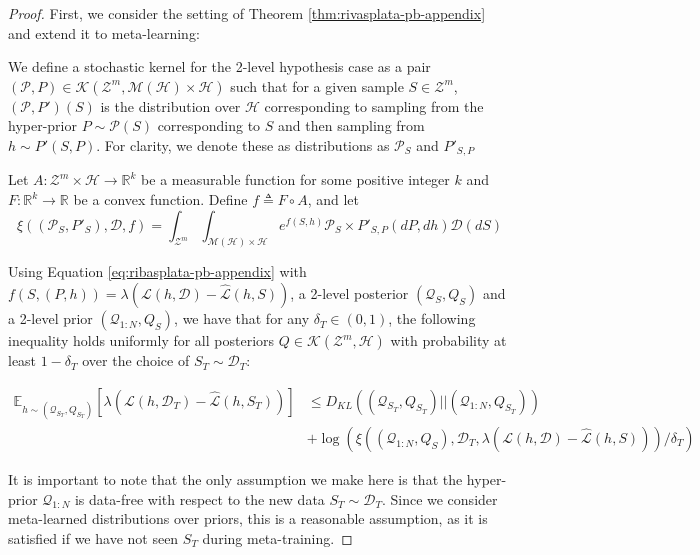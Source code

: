 \documentclass{article}
\theoremstyle{definition}
\newcommand{\Expect}[2]{\mathbb{E}_{#1}\left [#2 \right ]}
\begin{document}
\begin{proof}
	First, we consider the setting of Theorem \ref{thm:rivasplata-pb-appendix} and extend it to meta-learning:
	
	We define a stochastic kernel for the 2-level hypothesis case as a pair $(\mathcal{P},P)\in \mathcal{K}(\mathcal{Z}^m, \mathcal{M}(\mathcal{H})\times \mathcal{H})$ such that for a given sample $S\in \mathcal{Z}^m$,  $(\mathcal{P},P')(S)$ is the distribution over $\mathcal{H}$ corresponding to sampling from the hyper-prior $P\sim \mathcal{P}(S)$ corresponding to $S$ and then sampling from $h\sim P'(S, P)$. For clarity, we denote these as distributions as $\mathcal{P}_S$ and $P'_{S,P}$
	
	Let $A: \mathcal{Z}^m\times \mathcal{H}\rightarrow \mathbb{R}^k$ be a measurable function for some positive integer $k$ and $F:\mathbb{R}^k\rightarrow \mathbb{R}$ be a convex function.
	Define $f\triangleq F\circ A$, and let 
	$$\xi((\mathcal{P}_S,P'_S), \mathcal{D}, f)=\int_{\mathcal{Z}^m}\int_{\mathcal{M}(\mathcal{H})\times\mathcal{H}}e^{f(S, h)}\mathcal{P}_S\times P'_{S,P}(dP,dh)\mathcal{D}(dS)$$
	
	Using Equation \ref{eq:ribasplata-pb-appendix} with $f(S,(P,h))=\lambda(\mathcal{L}(h,\mathcal{D})-\hat{\mathcal{L}}(h,S))$, a 2-level posterior $(\mathcal{Q}_S, Q_S)$ and a 2-level prior $(\mathcal{Q}_{1:N}, Q_S)$,
	we have that for any $\delta_T \in (0,1)$, the following inequality holds uniformly for all posteriors $Q\in \mathcal{K}(\mathcal{Z}^m, \mathcal{H})$ with probability at least $1-\delta_T$ over the choice of $S_T\sim \mathcal{D}_T$:
	
	\begin{equation} \label{eq:appendix-proof-eq}
	\begin{split}
	\Expect{h\sim (\mathcal{Q}_{S_T}, Q_{S_T})}{\lambda(\mathcal{L}(h,\mathcal{D}_T)-\hat{\mathcal{L}}(h,S_T))} &\leq D_{KL}((\mathcal{Q}_{S_T}, Q_{S_T})||(\mathcal{Q}_{1:N}, Q_{S_T}))\\
	&+\log\left (\xi\left ((\mathcal{Q}_{1:N}, Q_S), \mathcal{D}_T, \lambda(\mathcal{L}(h,\mathcal{D})-\hat{\mathcal{L}}(h,S))\right )/\delta_T\right )
	\end{split}
	\end{equation}
	
	It is important to note that the only assumption we make here is that the hyper-prior $\mathcal{Q}_{1:N}$ is data-free with respect to the new data $S_T\sim \mathcal{D}_T$. Since we consider meta-learned distributions over priors, this is a reasonable assumption, as it is satisfied if we have not seen $S_T$ during meta-training.
	

\end{proof}
\end{document}

